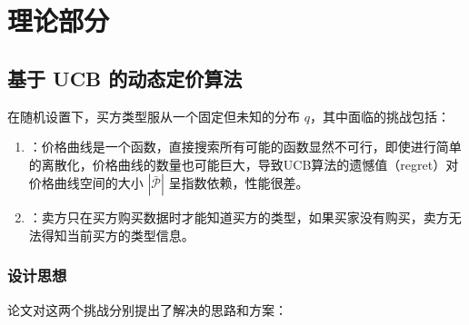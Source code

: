 \section{理论部分}

\subsection{基于 UCB 的动态定价算法}

在随机设置下，买方类型服从一个固定但未知的分布 $q$，其中面临的挑战包括：

\begin{enumerate}
    \item {}：价格曲线是一个函数，直接搜索所有可能的函数显然不可行，即使进行简单的离散化，价格曲线的数量也可能巨大，导致UCB算法的遗憾值（regret）对价格曲线空间的大小 $|\bar{\mathcal{P}}|$ 呈指数依赖，性能很差。
    \item {}：卖方只在买方购买数据时才能知道买方的类型，如果买家没有购买，卖方无法得知当前买方的类型信息。
\end{enumerate}

\subsubsection{设计思想}

论文对这两个挑战分别提出了解决的思路和方案：

